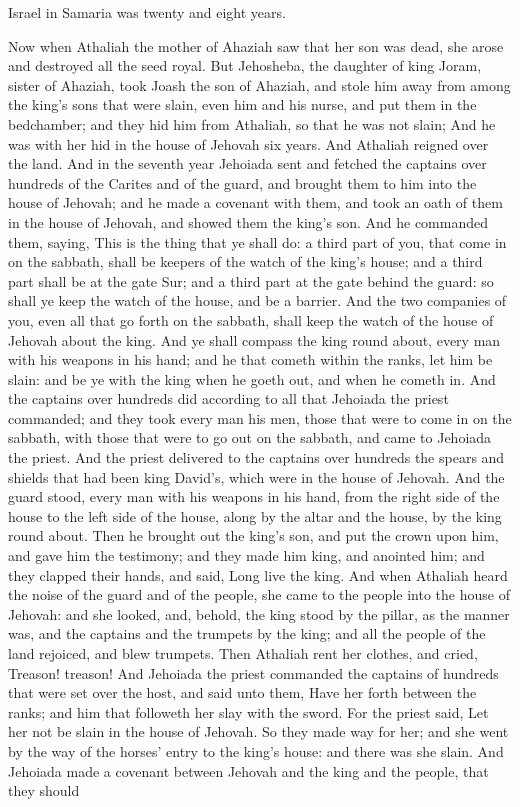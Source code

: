 Israel in Samaria was twenty and eight years. 

Now when Athaliah the mother of Ahaziah saw that her son was dead, she arose and destroyed all the seed royal. But Jehosheba, the daughter of king Joram, sister of Ahaziah, took Joash the son of Ahaziah, and stole him away from among the king’s sons that were slain, even him and his nurse, and put them in the bedchamber; and they hid him from Athaliah, so that he was not slain; And he was with her hid in the house of Jehovah six years. And Athaliah reigned over the land.  And in the seventh year Jehoiada sent and fetched the captains over hundreds of the Carites and of the guard, and brought them to him into the house of Jehovah; and he made a covenant with them, and took an oath of them in the house of Jehovah, and showed them the king’s son. And he commanded them, saying, This is the thing that ye shall do: a third part of you, that come in on the sabbath, shall be keepers of the watch of the king’s house; and a third part shall be at the gate Sur; and a third part at the gate behind the guard: so shall ye keep the watch of the house, and be a barrier. And the two companies of you, even all that go forth on the sabbath, shall keep the watch of the house of Jehovah about the king. And ye shall compass the king round about, every man with his weapons in his hand; and he that cometh within the ranks, let him be slain: and be ye with the king when he goeth out, and when he cometh in.  And the captains over hundreds did according to all that Jehoiada the priest commanded; and they took every man his men, those that were to come in on the sabbath, with those that were to go out on the sabbath, and came to Jehoiada the priest. And the priest delivered to the captains over hundreds the spears and shields that had been king David’s, which were in the house of Jehovah. And the guard stood, every man with his weapons in his hand, from the right side of the house to the left side of the house, along by the altar and the house, by the king round about. Then he brought out the king’s son, and put the crown upon him, and gave him the testimony; and they made him king, and anointed him; and they clapped their hands, and said, Long live the king.  And when Athaliah heard the noise of the guard and of the people, she came to the people into the house of Jehovah: and she looked, and, behold, the king stood by the pillar, as the manner was, and the captains and the trumpets by the king; and all the people of the land rejoiced, and blew trumpets. Then Athaliah rent her clothes, and cried, Treason! treason! And Jehoiada the priest commanded the captains of hundreds that were set over the host, and said unto them, Have her forth between the ranks; and him that followeth her slay with the sword. For the priest said, Let her not be slain in the house of Jehovah. So they made way for her; and she went by the way of the horses’ entry to the king’s house: and there was she slain.  And Jehoiada made a covenant between Jehovah and the king and the people, that they should 